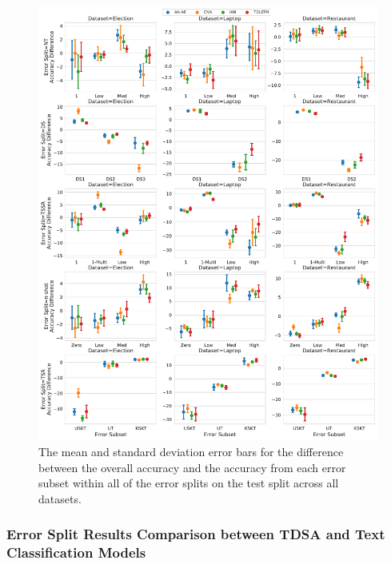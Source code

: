 \begin{figure}[h!]
    \centering
    \includegraphics[scale=0.43]{images/augmentation/methods_performance/baseline/test_error_diff_subsets.pdf}
    \caption{The mean and standard deviation error bars for the difference between the overall accuracy and the accuracy from each error subset within all of the error splits on the test split across all datasets.}
    \label{fig:aug_baseline_test_error_diff_subset}
\end{figure}

\FloatBarrier
\subsubsection{Error Split Results Comparison between TDSA and Text Classification Models}

